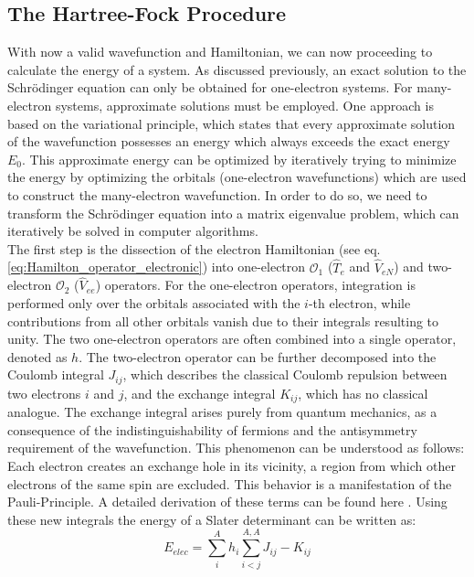 \subsection{The Hartree-Fock Procedure}
\label{sec:The_Hartree-Fock_Procedure}
With now a valid wavefunction and Hamiltonian, we can now proceeding to calculate the energy of a system. As discussed previously, an exact solution to the Schr\"odinger equation can only be obtained for one-electron systems. For many-electron systems, approximate solutions must be employed. One approach is based on the variational principle, which states that every approximate solution of the wavefunction possesses an energy which always exceeds the exact energy $E_{0}$. This approximate energy can be optimized by iteratively trying to minimize the energy by optimizing the orbitals (one-electron wavefunctions) which are used to construct the many-electron wavefunction. In order to do so, we need to transform the Schr\"odinger equation into a matrix eigenvalue problem, which can iteratively be solved in computer algorithms. \\
The first step is the dissection of the electron Hamiltonian (see eq. \ref{eq:Hamilton_operator_electronic}) into one-electron $\mathcal{O}_{1}$ ($\hat{T}_{e}$ and $\hat{V}_{eN}$) and two-electron $\mathcal{O}_{2}$ ($\hat{V}_{ee}$) operators. For the one-electron operators, integration is performed only over the orbitals associated with the $i$-th electron, while contributions from all other orbitals vanish due to their integrals resulting to unity. The two one-electron operators are often combined into a single operator, denoted as $h$. The two-electron operator can be further decomposed into the Coulomb integral $J_{ij}$, which describes the classical Coulomb repulsion between two electrons $i$ and $j$, and the exchange integral $K_{ij}$, which has no classical analogue. The exchange integral arises purely from quantum mechanics, as a consequence of the indistinguishability of fermions and the antisymmetry requirement of the wavefunction. This phenomenon can be understood as follows: Each electron creates an exchange hole in its vicinity, a region from which other electrons of the same spin are excluded. This behavior is a manifestation of the Pauli-Principle. A detailed derivation of these terms can be found here \cite{jensen2017introduction}. Using these new integrals the energy of a Slater determinant can be written as:
\begin{equation}
    E_{elec} = \sum_{i}^{A}h_{i} \sum_{i<j}^{A, A} J_{ij} - K_{ij}
    \label{eq:Energy_Slater}
\end{equation}

